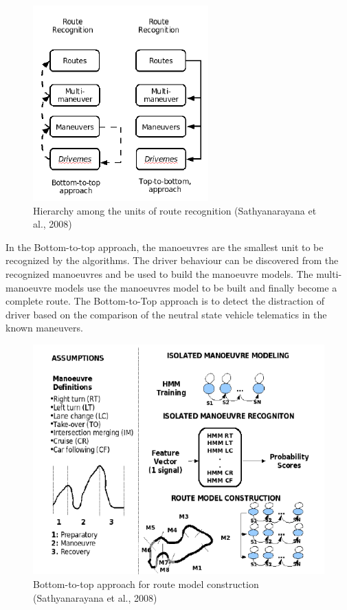 \begin{figure}[hbt!]\centering
\includegraphics[width=.75\textwidth]{image/HMM_flowchart}
\caption{Hierarchy among the units of route recognition (Sathyanarayana et al., 2008)}
\end{figure}

In the Bottom-to-top approach, the manoeuvres are the smallest unit to be recognized by the algorithms. The driver behaviour can be discovered from the recognized manoeuvres and be used to build the manoeuvre models. The multi-manoeuvre models use the manoeuvres model to be built and finally become a complete route. The Bottom-to-Top approach is to detect the distraction of driver based on the comparison of the neutral state vehicle telematics in the known maneuvers.

\begin{figure}[hbt!]\centering
\includegraphics[width=.75\textwidth]{image/BottomtoTop}
\caption{Bottom-to-top approach for route model construction (Sathyanarayana et al., 2008)}
\end{figure}


